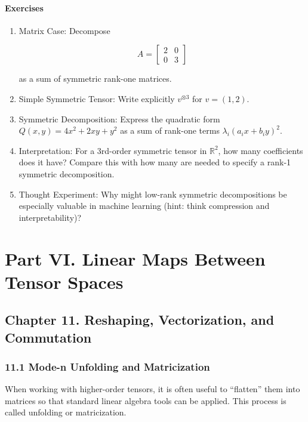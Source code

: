 \documentclass[
  letterpaper,
  DIV=11,
  numbers=noendperiod]{scrreprt}
\begin{document}
\subsubsection{Exercises}\label{exercises-39}

\begin{enumerate}
\def\labelenumi{\arabic{enumi}.}
\item
  Matrix Case: Decompose

  \[
  A = \begin{bmatrix}2 & 0 \\ 0 & 3\end{bmatrix}
  \]

  as a sum of symmetric rank-one matrices.
\item
  Simple Symmetric Tensor: Write explicitly \(v^{\otimes 3}\) for
  \(v=(1,2)\).
\item
  Symmetric Decomposition: Express the quadratic form
  \(Q(x,y) = 4x^2 + 2xy + y^2\) as a sum of rank-one terms
  \(\lambda_i (a_i x + b_i y)^2\).
\item
  Interpretation: For a 3rd-order symmetric tensor in \(\mathbb{R}^2\),
  how many coefficients does it have? Compare this with how many are
  needed to specify a rank-1 symmetric decomposition.
\item
  Thought Experiment: Why might low-rank symmetric decompositions be
  especially valuable in machine learning (hint: think compression and
  interpretability)?
\end{enumerate}


\chapter{Part VI. Linear Maps Between Tensor
Spaces}\label{part-vi.-linear-maps-between-tensor-spaces}

\section{Chapter 11. Reshaping, Vectorization, and
Commutation}\label{chapter-11.-reshaping-vectorization-and-commutation}

\subsection{11.1 Mode-n Unfolding and
Matricization}\label{mode-n-unfolding-and-matricization}

When working with higher-order tensors, it is often useful to
``flatten'' them into matrices so that standard linear algebra tools can
be applied. This process is called unfolding or matricization.
\end{document}

